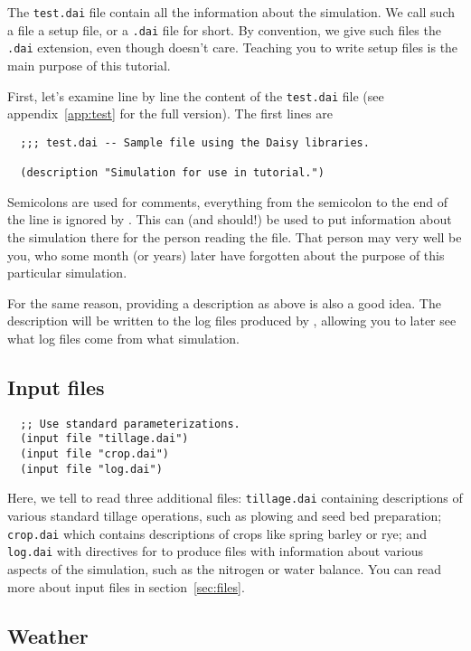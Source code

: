 \documentclass[a4paper,11pt]{article}
\begin{document}
The \texttt{test.dai} file contain all the information about the
simulation.  We call such a file a \daisy{} setup file, or a
\texttt{.dai} file for short.  By convention, we give such files the
\texttt{.dai} extension, even though \daisy{} doesn't care.  Teaching
you to write \daisy{} setup files is the main purpose of this
tutorial.

First, let's examine line by line the content of the \texttt{test.dai}
file (see appendix~\ref{app:test} for the full version).  The first
lines are

\begin{verbatim}
  ;;; test.dai -- Sample file using the Daisy libraries.

  (description "Simulation for use in tutorial.")
\end{verbatim}

Semicolons are used for comments, everything from the semicolon to the
end of the line is ignored by \daisy{}.  This can (and should!) be
used to put information about the simulation there for the person
reading the file.  That person may very well be you, who some month
(or years) later have forgotten about the purpose of this particular
simulation.

For the same reason, providing a description as above is also a good
idea.  The description will be written to the log files produced by
\daisy{}, allowing you to later see what log files come from what
simulation.

\subsection{Input files}
\label{sec:ex-input}

\begin{verbatim}
  ;; Use standard parameterizations.
  (input file "tillage.dai")
  (input file "crop.dai")
  (input file "log.dai")
\end{verbatim}

Here, we tell \daisy{} to read three additional files:
\texttt{tillage.dai} containing descriptions of various standard
tillage operations, such as plowing and seed bed preparation;
\texttt{crop.dai} which contains descriptions of crops like spring
barley or rye; and \texttt{log.dai} with directives for \daisy{} to
produce files with information about various aspects of the
simulation, such as the nitrogen or water balance.  You can read more
about input files in section~\ref{sec:files}.

\subsection{Weather}
\end{document}

